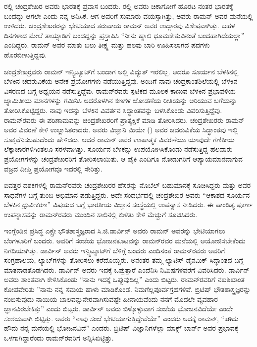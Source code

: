 ರಲ್ಲಿ ಚಂದ್ರಶೇಖರ ಅವರು ಭಾರತಕ್ಕೆ ಪ್ರವಾಸ ಬಂದರು. ರಲ್ಲಿ ಅವರು ಚಿಕಾಗೋಗೆ ಹೊರಟ ನಂತರ ಭಾರತಕ್ಕೆ ಬಂದದ್ದು ಆಗಲೇ ಎಂದು ನನ್ನ ಅನಿಸಿಕೆ. ಆಗ ಅವರಿಗೆ ಸುಮಾರು  ವಯಸ್ಸಾಗಿತ್ತು, ಅವರು ರಾಮನ್ ಅವರ ಮನೆಯಲ್ಲಿ ಉಳಿದರು. ಚಂದ್ರಶೇಖರರನ್ನು ಭೇಟಿಯಾದ ತರುವಾಯ ರಾಮನ್ ಅವರ ಉದ್ಗಾರವು ವಿಶೇಷವಾಗಿತ್ತು. ಬಹಳ ದಿನಗಳಾದ ಮೇಲೆ ತಾಯ್ನಾಡಿಗೆ ಬಂದದ್ದನ್ನು ಪ್ರಸ್ತಾಪಿಸಿ “ನೀನು ಹ್ಯಾಲಿ ಧೂಮಕೇತುವಿನಂತೆ ಬಂದಹಾಗಿದೆಯಲ್ಲಾ” ಎಂದಿದ್ದರು. ರಾಮನ್ ಅವರ ಮಾತು ಬಲು ತೀಕ್ಷ್ಣ ಮತ್ತು ಹಲವು ಬಾರಿ ಊಹಿಸಲಾಗದ ಪದಗಳು ಹೊರಬೀಳುತ್ತಿದ್ದವು.

\newpage

ಚಂದ್ರಶೇಖರ್‍ರವರು ರಾಮನ್ ಇನ್ಸ್ಟಿಟ್ಯೂಟ್‍ಗೆ ಬಂದಾಗ ಅಲ್ಲಿ ವಿದ್ಯುತ್ ಇರಲಿಲ್ಲ. ಆದರೂ ಸೂರ್ಯನ ಬೆಳಕಿನಲ್ಲಿ ಬೆಳಕಿನ ಚದರುವಿಕೆಯ ಅನೇಕ ಪ್ರಯೋಗಗಳು ನಡೆಯುತ್ತಿದ್ದವು. ಅಂದಿಗೆ ನಾವು ಚಂದ್ರಕಾಂತಶಿಲೆಯಲ್ಲಿ ಬೆಳಕಿನ ವಿಸರಣದ ಬಗ್ಗೆ ಅಧ್ಯಯನ ನಡೆಸುತ್ತಿದ್ದೆವು. ರಾಮನ್‍ರವರು ಸ್ಪಟಿಕದ ಮೂಲಕ ಕಾಣುವ ಬೆಳಕಿನ ಪ್ರಭಾವಳಿಯ ಜ್ಯಾಮಿತೀಯ ಮಾನಗಳನ್ನು ಗಮಿನಿಸಿ ಅದರೊಳಗಿನ ಕಣಗಳ ಜೋಡಣೆಯ ರೀತಿಯನ್ನು ಅರಿಯುವ ಬಗೆಯನ್ನು ತೋರಿಸಿಕೊಟ್ಟಿದ್ದರು. ನಾವು ಇದನ್ನು ಬೆಳಕಿನ ವಿವರ್ತನ ಸಿದ್ಧಾಂತವನ್ನು ಬಳಸಿಕೊಂಡು ವಿವರಿಸುತ್ತಿದ್ದೆವು. ರಾಮನ್‍ರವರು ಈ ಪರಿಣಾಮವನ್ನು ಚಂದ್ರಶೇಖರರಿಗೆ ಪ್ರಾತ್ಯಕ್ಷಿಕೆ ಮಾಡಿ ತೋರಿಸಿದರು. ಚಂದ್ರಶೇಖರರು ರಾಮನ್ ಅವರ ವಿವರಣೆ ಕೇಳಿ ಉಲ್ಲಾಸಿತರಾದರು. ಅವರು ವಿಜ್ಞಾನಿ ಮಿಯೇ () ಅವರ ಚದರುವಿಕೆಯ ಸಿದ್ಧಾಂತವು ಇಲ್ಲಿ ಸೂಕ್ತವೆನಿಸಬಹುದೆಂದು ಹೇಳಿದರು. ಆದರೆ ರಾಮನ್ ಅವರ ಊಹಾತ್ಮಕ ವಿವರಣೆಯು ಯಾವುದೇ ಗಣಿತೀಯ ಲೆಕ್ಕಾಚಾರಗಳಿಗಿಂತಲೂ ಸರಳವಾಗಿತ್ತು. ಸೂರ್ಯನ ಬೆಳಕನ್ನು ಉಪಯೋಗಿಸಿಕೊಂಡು ನಡೆಸುತ್ತಿದ್ದ ಹಲವಾರು ಪ್ರಯೋಗಗಳನ್ನು ಚಂದ್ರಶೇಖರರಿಗೆ ತೋರಿಸಲಾಯಿತು. ಆ ಪೈಕಿ ಎಂದಿಗೂ ನೋಡುಗರಿಗೆ ಆಪ್ಯಾಯಮಾನವಾಗುವ ವಜ್ರದ ದೀಪ್ತಿ ಪ್ರಯೋಗವೂ ಇದರಲ್ಲಿ ಸೇರಿತ್ತು.

ಐವತ್ತರ ದಶಕಗಳಲ್ಲಿ ರಾಮನ್‍ರವರು ಚಂದ್ರಶೇಖರರ ಹೆಸರನ್ನು ನೊಬೆಲ್ ಬಹುಮಾನಕ್ಕೆ ಸೂಚಿಸಿದ್ದರು ಮತ್ತು ಅವರ ಸಾಧನೆಗಳ ಬಗ್ಗೆ ತುಂಬ ಅಭಿಮಾನ ಪಡುತ್ತಿದ್ದರು. ಅದೇ ಸಂದರ್ಭದಲ್ಲಿ ಚಂದ್ರಶೇಖರ ಅವರು “ಆಕಾಶದ ಸೂರ್ಯನ ಬೆಳಕಿನ ಧ್ರುವೀಕರಣ” ವಿಷಯದ ಬಗ್ಗೆ ಭಾರತೀಯ ವಿಜ್ಞಾನ ಸಂಸ್ಥೆಯಲ್ಲಿ ಉಪನ್ಯಾಸ ನೀಡಿದರು. ಈ ಪಾಂಡಿತ್ಯ ಪೂರ್ಣ ಉಪನ್ಯಾಸವನ್ನು ರಾಮನ್‍ರವರು ಮುಂದಿನ ಸಾಲಿನಲ್ಲಿ ಕುಳಿತು ಕೇಳಿ ಮೆಚ್ಚುಗೆ ಸೂಚಿಸಿದರು.

\vskip 2pt



ಇಂಗ್ಲೆಂಡಿನ ಪ್ರಸಿದ್ಧ ಎಕ್ಸ್\enginline{-}ರೇ ಭೌತಶಾಸ್ತ್ರಜ್ಞರಾದ ಸಿ.ಜಿ.ಡಾರ್ವಿನ್ ಅವರು ರಾಮನ್ ಅವರನ್ನು ಭೇಟಿಯಾಗಲು ಬೆಂಗಳೂರಿಗೆ ಬಂದರು. ಅವರಿಗೆ ಸಂಜೆಯ ಭೋಜನಕೂಟವನ್ನು ರಾಮನ್‍ರವರ ಮನೆಯಲ್ಲಿ ಆಯೋಜಿಸಬೇಕೆಂದು ನಿಗದಿಯಾಗಿತ್ತು. ಡಾರ್ವಿನ್ ಅವರು ಇನ್ಸ್ಟಿಟ್ಯೂಟ್‍ಗೆ ಬೆಳಿಗ್ಗೆ ಬಂದರು ಎಂದಿನಂತೆ ರಾಮನ್‍ರವರು ಅವರಿಗೆ ಸಂಗ್ರಹಾಲಯ, ಲ್ಯಾಬ್‍ಗಳನ್ನು ತೋರಿಸಲು ಕರೆದೊಯ್ದರು. ಅನಂತರ ತಮ್ಮ ಲ್ಯಾಟಿಸ್ ಡೈನಮಿಕ್ ಸಿದ್ಧಾಂತದ ಬಗ್ಗೆ ಮಾತನಾಡತೊಡಗಿದರು. ಡಾರ್ವಿನ್ ಅವರು ಇದಕ್ಕೆ ಒಪ್ಪುತ್ತಾರೆ ಎಂದೆನಿಸಿ  ನಿಮಿಷಗಳವರೆಗೆ ವಿವರಿಸಿದರು. ಡಾರ್ವಿನ್ ಅವರು ಶಾಂತವಾಗಿ ಕೇಳಿಸಿಕೊಂಡು “ನಾನು ಇದಕ್ಕೆ ಒಪ್ಪುವುದಿಲ್ಲ” ಎಂದು ಬಿಟ್ಟರು. ರಾಮನ್‍ರವರಿಗೆ ನಖಶಿಖಾಂತ ಕೋಪವೇರಿತು ”ನಾನು ನನ್ನ ಸಮಯ ಹಾಳು ಮಾಡಿಕೊಂಡೆ. ನಿಮಗೆಲ್ಲ\break ಪೂರ್ವಗ್ರಹಗಳಿವೆ. ಬ್ರಿಟಿಷ್ ಭೌತಶಾಸ್ತ್ರಜ್ಞರನ್ನು ನಂಬಿಸುವುದು ನಾಯಿಯ ಬಾಲವನ್ನು\break ನೇರವಾಗಿಸುವಷ್ಟೇ ಹೀನಾಯವೆಂದು ನನಗೆ ಮೊದಲೇ ವ್ಯವಹಾರ ಜ್ಞಾನವಿರಬೇಕಿತ್ತು” ಎಂದು ಬಿಟ್ಟರು. ಡಾರ್ವಿನ್ ಅವರು ಬಿಳ್ಕೊಳ್ಳುವಾಗ ಸಂಜೆಯ ಭೋಜನವಿದೆಯೇ ಎಂದೇ ಸಂಶಯವಾಗಿ ಬಿಟ್ಟಿತ್ತು. ಅವರು “ನಾವು ಸಂಜೆ ಭೇಟಿಯಾಗುತ್ತಿದ್ದೇವೆಯೇ” ಎಂದರು ಅದಕ್ಕೆ ರಾಮನ್, “ಹೌದು ಹೌದು ನನ್ನ ಮನೆಯಲ್ಲಿ ಭೋಜನವಿದೆ” ಎಂದರು. ಬ್ರಿಟಿಷ್ ವಿಜ್ಞಾನಿಗಳೆಲ್ಲಾ ಮಾಕ್ಸ್ ಬಾರ್ನ್ ಅವರ ಪ್ರಭಾವಕ್ಕೆ ಒಳಗಾಗಿದ್ದಾರೆಂದು ರಾಮನ್‍ರವರಿಗೆ ಅನ್ನಿಸಿಬಿಟ್ಟಿತ್ತು.


